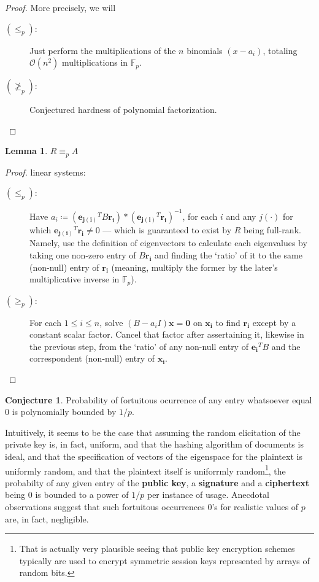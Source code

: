 \documentclass[a4paper,10pt]{article}
\theoremstyle{plain}
\theoremstyle{definition}
\newtheorem{lemm}[thm]{Lemma} %
\newtheorem{conj}[thm]{Conjecture} %
\theoremstyle{named}
\begin{document}
\begin{proof}
More precisely, we will 
\begin{description}
\item [$(\leq_p)$:] Just perform the multiplications of the $n$ binomials $(x-a_i)$, totaling $\mathcal{O}(n^2)$ multiplications in $\mathbb{F}_p$.
\item [$(\ngeq_p)$:] Conjectured hardness of polynomial factorization.
\end{description}
\end{proof}

\begin{lemm}
$R \equiv_p A$
\end{lemm}

\begin{proof}
linear systems:
\begin{description}
 \item [$(\leq_p)$:] Have $a_i \coloneqq (\mathbf{e_{j(i)}}^TB\mathbf{r_i})*(\mathbf{e_{j(i)}}^T\mathbf{r_i})^{-1}$, for each $i$ and any $j(\cdot)$ for which $\mathbf{e_{j(i)}}^T\mathbf{r_i} \neq 0$ --- which is guaranteed to exist by $R$ being full-rank. Namely, use the definition of eigenvectors to calculate each eigenvalues by taking one non-zero entry of $B\mathbf{r_i}$ and finding the `ratio' of it to the same (non-null) entry of $\mathbf{r_i}$ (meaning, multiply the former by the later's multiplicative inverse in $\mathbb{F}_p$).
 \item [$(\geq_p)$:] For each $1 \leq i \leq n$, solve $(B-a_iI)\mathbf{x}=\mathbf{0}$ on $\mathbf{x_i}$ to find $\mathbf{r_i}$ except by a constant scalar factor. Cancel that factor after assertaining it, likewise in the previous step, from the `ratio' of any non-null entry of $\mathbf{e_i}^TB$ and the correspondent (non-null) entry of $\mathbf{x_i}$.
\end{description}
\end{proof}

\begin{conj}
\label{conj:prentry01p}
Probability of fortuitous ocurrence of any entry whatsoever equal $0$ is polynomially bounded by $1/p$.
\end{conj}

Intuitively, it seems to be the case that assuming the random elicitation of the private key is, in fact, uniform, and that the hashing algorithm of documents is ideal, and that the specification of vectors of the eigenspace for the plaintext is uniformly random, and that the plaintext itself is uniforrmly random\footnote{That is actually very plausible seeing that public key encryption schemes typically are used to encrypt symmetric session keys represented by arrays of random bits.}, the probabilty of any given entry of the \textbf{public key}, a \textbf{signature} and a \textbf{ciphertext} being $0$ is bounded to a power of $1/p$ per instance of usage. Anecdotal observations suggest that such fortuitous occurrences $0$'s for realistic values of $p$ are, in fact, negligible.
\end{document}
